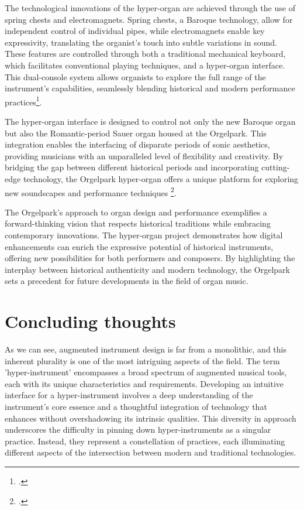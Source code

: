 \documentclass[12pt,twoside,maitrise]{dms_ks}
\theoremstyle{definition}
\begin{document}
The technological innovations of the hyper-organ are achieved through the use of spring chests and electromagnets. 
Spring chests, a Baroque technology, allow for independent control of individual pipes, while electromagnets enable key expressivity, translating the organist's touch into subtle variations in sound. 
These features are controlled through both a traditional mechanical keyboard, which facilitates conventional playing techniques, and a hyper-organ interface. 
This dual-console system allows organists to explore the full range of the instrument's capabilities, seamlessly blending historical and modern performance practices\footcite{peters_how_2014}.

The hyper-organ interface is designed to control not only the new Baroque organ but also the Romantic-period Sauer organ housed at the Orgelpark. 
This integration enables the interfacing of disparate periods of sonic aesthetics, providing musicians with an unparalleled level of flexibility and creativity. By bridging the gap between different historical periods and incorporating cutting-edge technology, the Orgelpark hyper-organ offers a unique platform for exploring new soundscapes and performance techniques \footcite{van_heumen_new_2014}.

The Orgelpark's approach to organ design and performance exemplifies a forward-thinking vision that respects historical traditions while embracing contemporary innovations. 
The hyper-organ project demonstrates how digital enhancements can enrich the expressive potential of historical instruments, offering new possibilities for both performers and composers. 
By highlighting the interplay between historical authenticity and modern technology, the Orgelpark sets a precedent for future developments in the field of organ music.

\section{Concluding thoughts}

As we can see, augmented instrument design is far from a monolithic, and this inherent plurality is one of the most intriguing aspects of the field.
The term 'hyper-instrument' encompasses a broad spectrum of augmented musical tools, each with its unique characteristics and requirements.
Developing an intuitive interface for a hyper-instrument involves a deep understanding of the instrument's core essence and a thoughtful integration of technology that enhances without overshadowing its intrinsic qualities.
This diversity in approach underscores the difficulty in pinning down hyper-instruments as a singular practice.
Instead, they represent a constellation of practices, each illuminating different aspects of the intersection between modern and traditional technologies.
\end{document}
